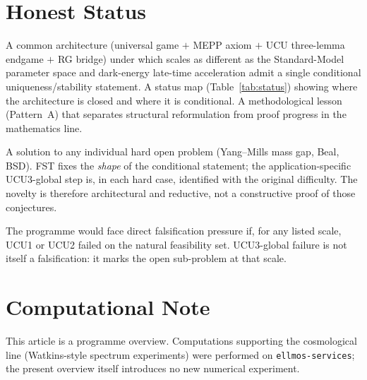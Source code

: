 \documentclass[11pt,a4paper]{article}
\theoremstyle{remark}
\begin{document}
\section{Honest Status}
\label{sec:honest-status}

\begin{description}[leftmargin=2em,style=nextline]
\item[What FST provides.]
A common architecture (universal game $+$ MEPP axiom $+$ UCU
three-lemma endgame $+$ RG bridge) under which scales as different
as the Standard-Model parameter space and dark-energy late-time
acceleration admit a single conditional uniqueness/stability
statement. A status map (Table~\ref{tab:status}) showing where
the architecture is closed and where it is conditional. A
methodological lesson (Pattern~A) that separates structural
reformulation from proof progress in the mathematics line.

\item[What FST does \emph{not} provide.]
A solution to any individual hard open problem (Yang--Mills mass
gap, Beal, BSD). FST fixes the \emph{shape} of the conditional
statement; the application-specific UCU3-global step is, in each
hard case, identified with the original difficulty. The novelty
is therefore architectural and reductive, not a constructive proof
of those conjectures.

\item[Falsification criterion.]
The programme would face direct falsification pressure if, for any
listed scale, UCU1 or UCU2 failed on the natural feasibility set.
UCU3-global failure is not itself a falsification: it marks the open
sub-problem at that scale.
\end{description}

\section*{Computational Note}
This article is a programme overview. Computations supporting the
cosmological line (Watkins-style spectrum experiments) were performed
on \texttt{ellmos-services}; the present overview itself introduces no
new numerical experiment.

\end{document}
